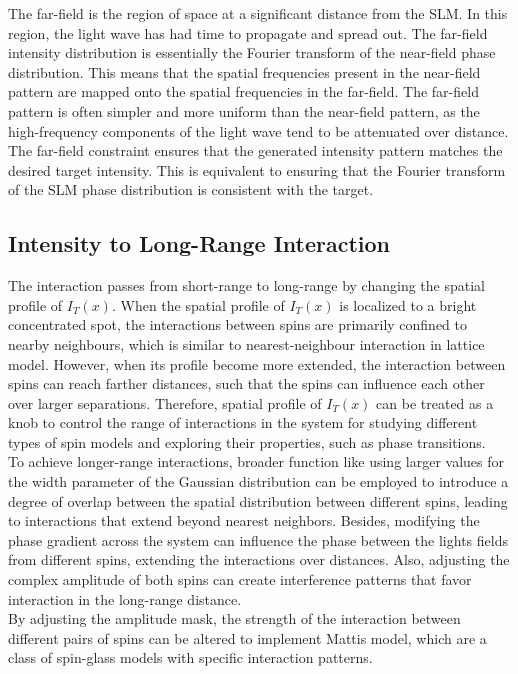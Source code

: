 The far-field is the region of space at a significant distance from the SLM. In this region, the light wave has had time to propagate and spread out. The far-field intensity distribution is essentially the Fourier transform of the near-field phase distribution. This means that the spatial frequencies present in the near-field pattern are mapped onto the spatial frequencies in the far-field. The far-field pattern is often simpler and more uniform than the near-field pattern, as the high-frequency components of the light wave tend to be attenuated over distance. The far-field constraint ensures that the generated intensity pattern matches the desired target intensity. This is equivalent to ensuring that the Fourier transform of the SLM phase distribution is consistent with the target. \\ 

\subsection{Intensity to Long-Range Interaction}
The interaction passes from short-range to long-range by changing the spatial profile of $I_T(x)$. When the spatial profile of $I_T(x)$ is localized to a bright concentrated spot, the interactions between spins are primarily confined to nearby neighbours, which is similar to nearest-neighbour interaction in lattice model. However, when its profile become more extended, the interaction between spins can reach farther distances, such that the spins can influence each other over larger separations. Therefore, spatial profile of $I_T(x)$ can be treated as a knob to control the range of interactions in the system for studying different types of spin models and exploring their properties, such as phase transitions. \\

To achieve longer-range interactions, broader function like using larger values for the width parameter of the Gaussian distribution can be employed to introduce a degree of overlap between the spatial distribution between different spins, leading to interactions that extend beyond nearest neighbors. Besides, modifying the phase gradient across the system can influence the phase between the lights fields from different spins, extending the interactions over distances. Also, adjusting the complex amplitude of both spins can create interference patterns that favor interaction in the long-range distance. \\

By adjusting the amplitude mask, the strength of the interaction between different pairs of spins can be altered to implement Mattis model, which are a class of spin-glass models with specific interaction patterns. 

